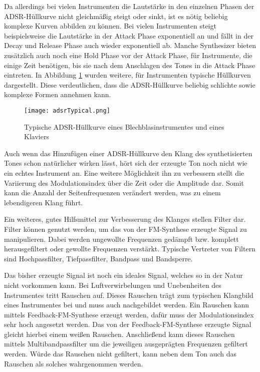Da allerdings bei vielen Instrumenten die Lautstärke in den einzelnen Phasen der ADSR-Hüllkurve nicht gleichmäßig steigt oder sinkt, ist es nötig beliebig komplexe Kurven abbilden zu können. Bei vielen Instrumenten steigt beispielsweise die Lautstärke in der Attack Phase exponentiell an und fällt in der Decay und Release Phase auch wieder exponentiell ab. Manche Synthesizer bieten zusätzlich auch noch eine Hold Phase vor der Attack Phase, für Instrumente, die einige Zeit benötigen, bis sie nach dem Anschlagen des Tones in die Attack Phase eintreten. In Abbildung \ref{fig:adsrTypical} wurden weitere, für Instrumenten typische Hüllkurven dargestellt. Diese verdeutlichen, dass die ADSR-Hüllkurve beliebig schlichte sowie komplexe Formen annehmen kann.

\begin{figure} [ht]
\centering
  \texttt{[image: adsrTypical.png]}
\caption{Typische ADSR-Hüllkurve eines Blechblasinstrumentes \cite{chowningPaper} und eines Klaviers}
\label{fig:adsrTypical} 
\end{figure}

Auch wenn das Hinzufügen einer ADSR-Hüllkurve den Klang des synthetisierten Tones schon natürlicher wirken lässt, hört sich der erzeugte Ton noch nicht wie ein echtes Instrument an. Eine weitere Möglichkeit ihn zu verbessern stellt die Variierung des Modulationsindex über die Zeit oder die Amplitude dar. Somit kann die Anzahl der Seitenfrequenzen verändert werden, was zu einem lebendigeren Klang führt. \cite[S. 532]{chowningPaper}

Ein weiteres, gutes Hilfsmittel zur Verbesserung des Klanges stellen Filter dar. Filter können genutzt werden, um das von der FM-Synthese erzeugte Signal zu manipulieren. Dabei werden ungewollte Frequenzen gedämpft bzw. komplett herausgefiltert oder gewollte Frequenzen verstärkt. Typische Vertreter von Filtern sind Hochpassfilter, Tiefpassfilter, Bandpass und Bandsperre. \cite[S. 100-104]{stotz}

Das bisher erzeugte Signal ist noch ein ideales Signal, welches so in der Natur nicht vorkommen kann. Bei Luftverwirbelungen und Unebenheiten des Instrumentes tritt Rauschen auf. Dieses Rauschen trägt zum typischen Klangbild eines Instrumentes bei und muss auch nachgebildet werden. Ein Rauschen kann mittels Feedback-FM-Synthese erzeugt werden, dafür muss der Modulationsindex sehr hoch angesetzt werden. Das von der Feedback-FM-Synthese erzeugte Signal gleicht hierbei einem weißen Rauschen. Anschließend kann dieses Rauschen mittels Multibandpassfilter um die jeweiligen ausgeprägten Frequenzen gefiltert werden. Würde das Rauschen nicht gefiltert, kann neben dem Ton auch das Rauschen als solches wahrgenommen werden. \cite[S. 152]{barkowsky}


